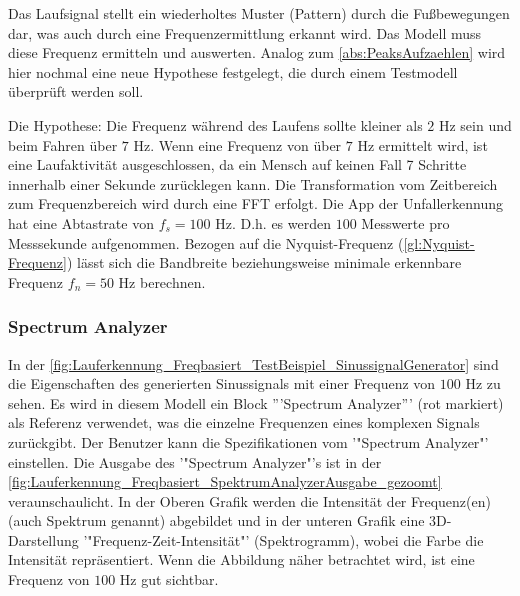 Das Laufsignal stellt ein wiederholtes Muster (Pattern) durch die Fußbewegungen dar, was auch durch eine Frequenzermittlung erkannt wird.
Das Modell muss diese Frequenz ermitteln und auswerten.
Analog zum \autoref{abs:PeaksAufzaehlen} wird hier nochmal eine neue Hypothese festgelegt, die durch einem Testmodell überprüft werden soll.

Die Hypothese: Die Frequenz während des Laufens sollte kleiner als $2$ Hz sein und beim Fahren über $7$ Hz. Wenn eine Frequenz von über $7$ Hz ermittelt wird, ist eine Laufaktivität ausgeschlossen, da ein Mensch auf keinen Fall 7 Schritte innerhalb einer Sekunde zurücklegen kann. Die Transformation vom Zeitbereich zum Frequenzbereich wird durch eine FFT erfolgt.
Die App der Unfallerkennung hat eine Abtastrate von $f_s = 100$ Hz. D.h. es werden $100$ Messwerte pro Messsekunde aufgenommen.
Bezogen auf die Nyquist-Frequenz (\autoref{gl:Nyquist-Frequenz}) lässt sich die Bandbreite beziehungsweise minimale erkennbare Frequenz $f_n = 50$ Hz berechnen.

\subsubsection{Spectrum Analyzer}
In der \autoref{fig:Lauferkennung_Freqbasiert_TestBeispiel_SinussignalGenerator} sind die Eigenschaften des generierten Sinussignals mit einer Frequenz von $100$ Hz zu sehen.
Es wird in diesem Modell ein Block '''Spectrum Analyzer''' (rot markiert) als Referenz verwendet, was die einzelne Frequenzen eines komplexen Signals zurückgibt. Der Benutzer kann die Spezifikationen vom '"Spectrum Analyzer"' einstellen. Die Ausgabe des '"Spectrum Analyzer"'s ist in der \autoref{fig:Lauferkennung_Freqbasiert_SpektrumAnalyzerAusgabe_gezoomt} veraunschaulicht. In der Oberen Grafik werden die Intensität der Frequenz(en) (auch Spektrum genannt) abgebildet und in der unteren Grafik eine 3D-Darstellung '"Frequenz-Zeit-Intensität"' (Spektrogramm), wobei die Farbe die Intensität repräsentiert. Wenn die Abbildung näher betrachtet wird, ist eine Frequenz von $100$ Hz gut sichtbar.

